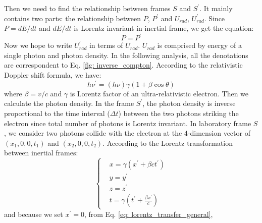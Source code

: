 \documentclass[12pt]{report}
\begin{document}
            Then we need to find the relationship between frames $S$ and $S^{\prime}$. 
            It mainly contains two parts: the relationship between $P$, $P^{\prime}$ and 
            $U_{rad}$, $U_{rad}^{\prime}$. Since $P = dE/dt$ and $dE/dt$ is Lorentz invariant 
            in inertial frame, we get the equation: 
            \begin{equation}
              \label{eq: power_is_equal}
              P = P^{\prime}
            \end{equation}
            Now we hope to write $U_{rad}^{\prime}$ in terms of $U_{rad}$. $U_{rad}$ is 
            comprised by energy of a single photon and photon density. In the following
            analysis, all the denotations are correspondent to Eq. \ref{fig: inverse_compton}. 
            According to the relativistic Doppler shift formula, we have: 
            \begin{equation}
              \label{eq: doppler_shift}
              h \nu^{\prime} = \left(h \nu\right) \gamma \left(1 + \beta \cos{\theta} \right)
            \end{equation}
            where $\beta = v / c$ and $\gamma$ is Lorentz factor of an ultra-relativistic 
            electron. Then we calculate the photon density. In the frame $S^{\prime}$, the 
            photon density is inverse proportional to the time interval ($\Delta t$) between 
            the two photons striking the electron since total number of photons is Lorentz 
            invariant. In laboratory frame $S$, we consider two photons collide with the 
            electron at the 4-dimension vector of 
            $\left(x_{1}, 0, 0, t_{1}\right)$ and $\left(x_{2}, 0, 0, t_{2}\right)$. 
            According to the Lorentz transformation between inertial frames: 
            \begin{equation}
              \label{eq: lorentz_transfer_general}
                \begin{cases}
                  & x = \gamma \left( x^{\prime} + \beta c t^{\prime} \right)\\
                  & y = y^{\prime} \\
                  & z = z^{\prime} \\ 
                  & t = \gamma \left(t^{\prime} + \frac{\beta x^{\prime}}{c}\right)
                \end{cases}       
            \end{equation}
            and because we set $x^{\prime} = 0$, from Eq. \ref{eq: lorentz_transfer_general}, 
\end{document}
